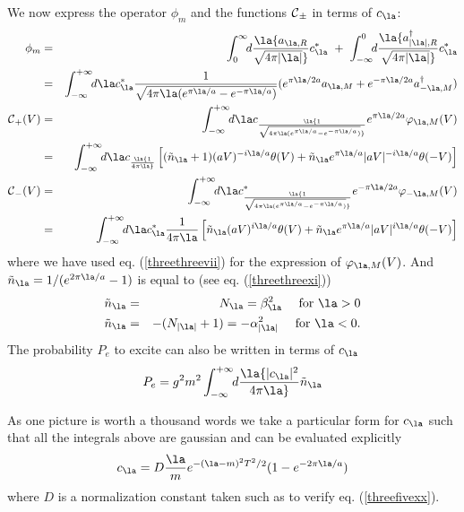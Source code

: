 We now express the operator $\phi_m$ and the
functions  $\mbox{$\cal C $}_\pm$
 in terms of
$c_\la$:
\begin{eqnarray}
\phi_m &=& \int_0^\infty\!\! d \la  {a_{\la,R} \over \sqrt{4
\pi \vert \la \vert }}c_\la^*  \ + \  \int_{-\infty}^0\!\! d \la
{a_{\vert\la\vert,R}^\dagger  \over \sqrt{4 \pi \vert \la \vert }}c_\la^*
\nonumber\\ &=&\int_{-\infty}^{+\infty}\!\! d\la c_\la^* {1 \over \sqrt{4 \pi
\la (e^{\pi \la/a} - e^{-\pi \la /a})}}  (e^{\pi \la/2a} a_{\la,M} + e^{-\pi
\la/2a} a_{-\la,M}^\dagger ) \nonumber\\
\cc_+(V) &=&
\int_{-\infty}^{+\infty}\!\! d\la c_\la {1 \over \sqrt{4 \pi  \la (e^{\pi
\la/a} - e^{-\pi \la /a})}}
 e^{\pi \la/2a} \varphi_{\la,M}(V) \nonumber\\  &=&
\int_{-\infty}^{+\infty}\!\! d\la c_\la
{1 \over 4 \pi  \la}  \left[
( \tilde n_\la + 1) (aV)^{-i\la/a} \theta(V) +
\tilde n_\la e^{\pi \la/a}
\vert aV \vert^{- i\la/a} \theta(-V)
\right]\nonumber\\
 \cc_-(V)  &=&
\int_{-\infty}^{+\infty}\!\! d\la c^*_\la {1 \over \sqrt{4 \pi  \la (e^{\pi
\la/a} - e^{-\pi \la /a})}}
 e^{-\pi \la/2a} \varphi_{-\la,M}(V)\nonumber\\
 &=& \int_{-\infty}^{+\infty}\!\! d\la c_\la^*
{1 \over 4 \pi \la}
\left[ \tilde n_\la  (aV)^{i\la/a} \theta(V) +
\tilde n_\la e^{\pi \la/a} \vert aV \vert^{i\la/a} \theta(-V)
\right] \label{threefivexxiii} \end{eqnarray}
where we have used eq. (\ref{threethreevii})
for the expression of $\varphi_{\la,M}(V)$.
And
$\tilde n_\la = 1/ (e^{2 \pi \la/a}-1)$
is equal to (see eq. (\ref{threethreexi}))
\begin{eqnarray} \tilde n_\la &=&N_{\la}= \beta_{\la}^2
\quad \hbox{ for $\la > 0$}\nonumber\\
\tilde n_\la &=&-(N_{\vert\la\vert}+1)= -\alpha_{\vert\la\vert}^2
\quad \hbox{ for $\la
< 0$.} \end{eqnarray}
The probability $P_{e}$ to excite can also be written
in terms of $c_\la$
\begin{equation} P_{e} = g^2 m^2
\int_{-\infty}^{+\infty}\!\! d\la { \vert c_\la \vert^2 \over 4 \pi \la}
\tilde n_\la  \label{threefivexxiv} \end{equation}

As one picture is worth a thousand words we take a particular form for
$c_\la$ such that all the integrals above are gaussian and  can be
evaluated explicitly
\begin{equation}  c_\la = D { \la \over m} e^{-(\la - m )^2 T^2 /2}
 (1 -
e^{-2\pi \la /a})
 \label{threefivexxv} \end {equation} where $D$ is a
normalization constant taken such as to verify eq. (\ref{threefivexx}).

